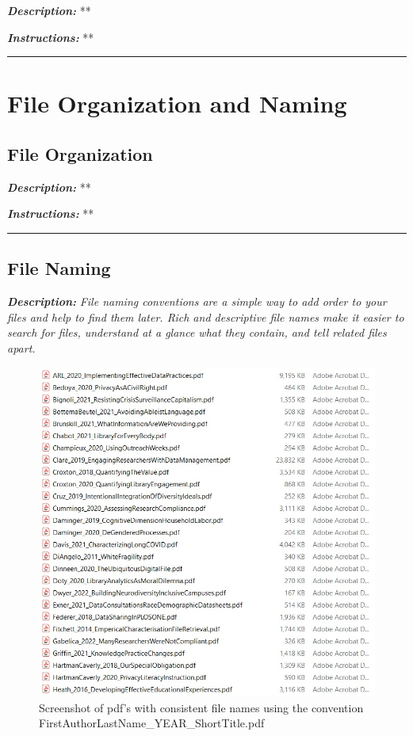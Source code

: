 \documentclass[
]{book}
\begin{document}
\textbf{\emph{Description:}} **

\textbf{\emph{Instructions:}} **

\begin{center}\rule{0.5\linewidth}{0.5pt}\end{center}

\hypertarget{file-organization-and-naming}{%
\chapter{File Organization and Naming}\label{file-organization-and-naming}}

\hypertarget{file-organization}{%
\section{File Organization}\label{file-organization}}

\textbf{\emph{Description:}} **

\textbf{\emph{Instructions:}} **

\begin{center}\rule{0.5\linewidth}{0.5pt}\end{center}

\hypertarget{file-naming}{%
\section{File Naming}\label{file-naming}}

\textbf{\emph{Description:}} \emph{File naming conventions are a simple way to add order to your files and help to find them later. Rich and descriptive file names make it easier to search for files, understand at a glance what they contain, and tell related files apart.}

\begin{figure}
\centering
\includegraphics{images/03_FileNaming.jpg}
\caption{Screenshot of pdf's with consistent file names using the convention FirstAuthorLastName\_YEAR\_ShortTitle.pdf}
\end{figure}
\end{document}
